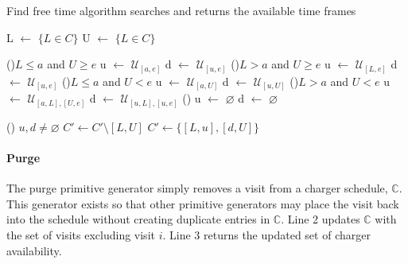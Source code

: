 \documentclass[11pt,a4paper,final]{article}
\newcommand{\C}{\mathbb{C}}                 %
\newcommand{\U}{\mathcal{U}}                %
\begin{document}
\begin{algorithm}[H]
\caption{Find free time algorithm searches and returns the available time frames} \label{alg:find-free-time}
    \LinesNumbered

    L \(\leftarrow\) \(\{L \in C\}\)\;
    U \(\leftarrow\) \(\{L \in C\}\)\;

    \Begin
    {
        \If(\tcc*[f]{If $L < a < e < U]$ (\autoref{subfig:sandwich})}){$L \leq a$ and $U \geq e$}
        {
                u $\leftarrow$ $\U_{[a,e]}$\;
                d $\leftarrow$ $\U_{[u,e]}$\;
        }
        \ElseIf(){$L > a$ and $U \geq e$}
        {
                u $\leftarrow$ $\U_{[L,e]}$\;
                d $\leftarrow$ $\U_{[u,e]}$\;
        }
        \ElseIf(){$L \leq a$ and $U < e$}
        {
                u $\leftarrow$ $\U_{[a,U]}$\;
                d $\leftarrow$ $\U_{[u,U]}$\;
        }
        \ElseIf(){$L > a$ and $U < e$}
        {
                u $\leftarrow$ $\U_{[a,L], [U,e]}$\;
                d $\leftarrow$ $\U_{[u,L], [u,e]}$\;
        }
        \Else()
        {
                u $\leftarrow$ $\varnothing$\;
                d $\leftarrow$ $\varnothing$\;
        }

        \If () {$u,d \ne \varnothing$}
        {
            $C' \leftarrow C' \setminus [L,U]$
            $C' \leftarrow \{[L,u], [d, U]\}$
        }

    }
\end{algorithm}

\paragraph{Purge}
\label{sec:purge}
The purge primitive generator simply removes a visit from a charger schedule, \(\C\). This generator exists so that other
primitive generators may place the visit back into the schedule without creating duplicate entries in \(\C\). Line 2
updates \(\C\) with the set of visits excluding visit \(i\). Line 3 returns the updated set of charger availability.
\end{document}
